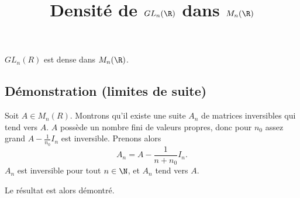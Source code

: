 \documentclass[fontsize=12pt,twoside=false,parskip=half, french]{scrartcl}
\title{Densité de $GL_n(\R)$ dans $M_n(\R)$}
\date{}
\author{}
\begin{document}
\maketitle
   \begin{Theoreme}
      $GL_n(R)$ est dense dans $M_n(\R)$.
   \end{Theoreme}
   \subsection{Démonstration (limites de suite)}
      Soit $A \in M_n(R)$. Montrons qu’il existe une suite $A_n$ de matrices inversibles qui tend vers $A$.
      $A$ possède un nombre fini de valeurs propres, donc pour $n_0$ assez grand $A - \frac{1}{n_0}I_n$ est 
      inversible. Prenons alors
      \[
         A_n = A - \frac{1}{n + n_0}I_n.
      \]
      $A_n$ est inversible pour tout $n \in \N$, et $A_n$ tend vers $A$.
      
      Le résultat est alors démontré.
\end{document}
